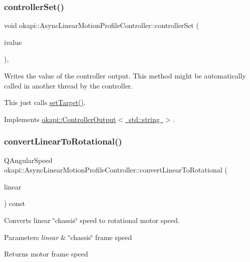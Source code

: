 \subsubsection{\texorpdfstring{controllerSet()}{controllerSet()}}
{\footnotesize\ttfamily void okapi\+::\+Async\+Linear\+Motion\+Profile\+Controller\+::controller\+Set (\begin{DoxyParamCaption}\item[{std\+::string}]{ivalue }\end{DoxyParamCaption})\hspace{0.3cm}{\ttfamily [override]}, {\ttfamily [virtual]}}

Writes the value of the controller output. This method might be automatically called in another thread by the controller.

This just calls {\ttfamily \mbox{\hyperlink{classokapi_1_1AsyncLinearMotionProfileController_a18e3ba77f08cb5dd93a9cba23d4c2a1e}{set\+Target()}}}. 

Implements \mbox{\hyperlink{classokapi_1_1ControllerOutput_a360c08f0c10b36f882d6d3100c2cad49}{okapi\+::\+Controller\+Output$<$ std\+::string $>$}}.

\mbox{\label{classokapi_1_1AsyncLinearMotionProfileController_a3b2473f949bab83f6837b8d448b198cb}} 
\subsubsection{\texorpdfstring{convertLinearToRotational()}{convertLinearToRotational()}}
{\footnotesize\ttfamily Q\+Angular\+Speed okapi\+::\+Async\+Linear\+Motion\+Profile\+Controller\+::convert\+Linear\+To\+Rotational (\begin{DoxyParamCaption}\item[{Q\+Speed}]{linear }\end{DoxyParamCaption}) const\hspace{0.3cm}{\ttfamily [protected]}}

Converts linear \char`\"{}chassis\char`\"{} speed to rotational motor speed.


\begin{DoxyParams}{Parameters}
{\em linear} & \char`\"{}chassis\char`\"{} frame speed \\
\hline
\end{DoxyParams}
\begin{DoxyReturn}{Returns}
motor frame speed 
\end{DoxyReturn}
\mbox{\label{classokapi_1_1AsyncLinearMotionProfileController_ac9f7d18503d72627ff4b7f70d2c373bd}} 
